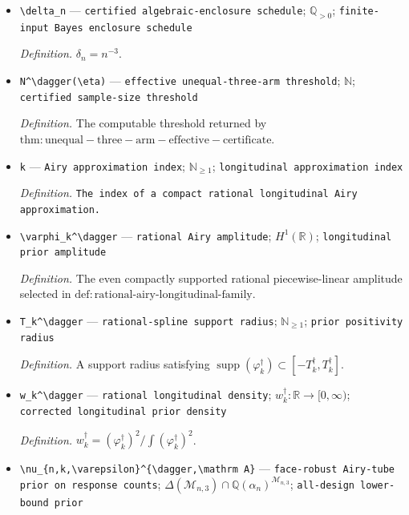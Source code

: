 \documentclass{article}
\begin{document}
\begin{itemize}
  \item \texttt{\textbackslash{}\allowbreak{}delta\_\allowbreak{}n} --- \texttt{certified algebraic-\allowbreak{}enclosure schedule}; \(\mathbb Q_{>0}\); \texttt{finite-\allowbreak{}input Bayes enclosure schedule}
  \par\smallskip\noindent\emph{Definition.} \(\delta_n=n^{-3}\).
  \item \texttt{N\textasciicircum{}\textbackslash{}\allowbreak{}dagger(\textbackslash{}\allowbreak{}eta)} --- \texttt{effective unequal-\allowbreak{}three-\allowbreak{}arm threshold}; \(\mathbb N\); \texttt{certified sample-\allowbreak{}size threshold}
  \par\smallskip\noindent\emph{Definition.} The computable threshold returned by \(\mathrm{thm:unequal-three-arm-effective-certificate}\).
  \item \texttt{k} --- \texttt{Airy approximation index}; \(\mathbb N_{\ge1}\); \texttt{longitudinal approximation index}
  \par\smallskip\noindent\emph{Definition.} \texttt{The index of a compact rational longitudinal Airy approximation.}
  \item \texttt{\textbackslash{}\allowbreak{}varphi\_\allowbreak{}k\textasciicircum{}\textbackslash{}\allowbreak{}dagger} --- \texttt{rational Airy amplitude}; \(H^1(\mathbb R)\); \texttt{longitudinal prior amplitude}
  \par\smallskip\noindent\emph{Definition.} The even compactly supported rational piecewise-linear amplitude selected in \(\mathrm{def:rational\text{-}airy\text{-}longitudinal\text{-}family}\).
  \item \texttt{T\_\allowbreak{}k\textasciicircum{}\textbackslash{}\allowbreak{}dagger} --- \texttt{rational-\allowbreak{}spline support radius}; \(\mathbb N_{\ge1}\); \texttt{prior positivity radius}
  \par\smallskip\noindent\emph{Definition.} A support radius satisfying \(\operatorname{supp}(\varphi_k^\dagger)\subset[-T_k^\dagger,T_k^\dagger]\).
  \item \texttt{w\_\allowbreak{}k\textasciicircum{}\textbackslash{}\allowbreak{}dagger} --- \texttt{rational longitudinal density}; \(w_k^\dagger:\mathbb R\to[0,\infty)\); \texttt{corrected longitudinal prior density}
  \par\smallskip\noindent\emph{Definition.} \(w_k^\dagger=(\varphi_k^\dagger)^2/\int(\varphi_k^\dagger)^2\).
  \item \texttt{\textbackslash{}\allowbreak{}nu\_\allowbreak{}\{n,\allowbreak{}k,\allowbreak{}\textbackslash{}\allowbreak{}varepsilon\}\allowbreak{}\textasciicircum{}\{\textbackslash{}\allowbreak{}dagger,\allowbreak{}\textbackslash{}\allowbreak{}mathrm A\}\allowbreak{}} --- \texttt{face-\allowbreak{}robust Airy-\allowbreak{}tube prior on response counts}; \(\Delta(\mathcal M_{n,3})\cap\mathbb Q(\alpha_n)^{\mathcal M_{n,3}}\); \texttt{all-\allowbreak{}design lower-\allowbreak{}bound prior}

\end{itemize}
\end{document}
